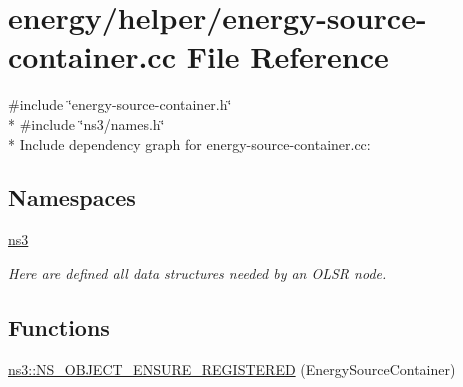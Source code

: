 \hypertarget{energy-source-container_8cc}{}\section{energy/helper/energy-\/source-\/container.cc File Reference}
\label{energy-source-container_8cc}
{\ttfamily \#include \char`\"{}energy-\/source-\/container.\+h\char`\"{}}\\*
{\ttfamily \#include \char`\"{}ns3/names.\+h\char`\"{}}\\*
Include dependency graph for energy-\/source-\/container.cc\+:
\subsection*{Namespaces}
\begin{DoxyCompactItemize}
\item 
 \hyperlink{namespacens3}{ns3}
\begin{DoxyCompactList}\small\item\em Here are defined all data structures needed by an O\+L\+SR node. \end{DoxyCompactList}\end{DoxyCompactItemize}
\subsection*{Functions}
\begin{DoxyCompactItemize}
\item 
\hyperlink{namespacens3_ac1bab8ac6eae98c7ac642ed9f104272e}{ns3\+::\+N\+S\+\_\+\+O\+B\+J\+E\+C\+T\+\_\+\+E\+N\+S\+U\+R\+E\+\_\+\+R\+E\+G\+I\+S\+T\+E\+R\+ED} (Energy\+Source\+Container)
\end{DoxyCompactItemize}
